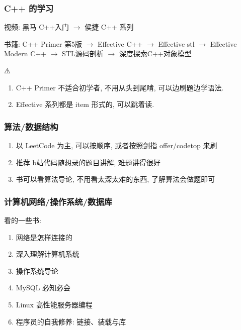\documentclass{ctexbeamer}
\begin{document}
\begin{frame}
	\frametitle{C++ 的学习}

	视频: 黑马 C++入门 $\longrightarrow$ 侯捷 C++ 系列

	书籍: C++ Primer 第5版  $\longrightarrow$  Effective C++  $\longrightarrow$ Effective stl  $\longrightarrow$ Effective Modern C++ $\longrightarrow$  STL源码剖析 $\longrightarrow$  深度探索C++对象模型

	\begin{exampleblock}{⚠️}
		\begin{enumerate}
			\item C++ Primer 不适合初学者, 不用从头到尾啃, 可以边刷题边学语法. 
			\item Effective 系列都是 item 形式的, 可以跳着读. 
		\end{enumerate}
		
	\end{exampleblock}
\end{frame}

\begin{frame}
	\frametitle{算法/数据结构}

	\begin{enumerate}
		\item 以 LeetCode 为主, 可以按顺序, 或者按照剑指 offer/codetop 来刷
		\item 推荐 b站代码随想录的题目讲解, 难题讲得很好
		\item 书可以看算法导论, 不用看太深太难的东西, 了解算法会做题即可
	\end{enumerate}

\end{frame}

\begin{frame}
	\frametitle{计算机网络/操作系统/数据库}
	看的一些书: 
	\begin{enumerate}
		\item 网络是怎样连接的
		\item 深入理解计算机系统
		\item 操作系统导论
		\item MySQL 必知必会
		\item Linux 高性能服务器编程
		\item 程序员的自我修养: 链接、装载与库
	\end{enumerate}

\end{frame}
\end{document}
